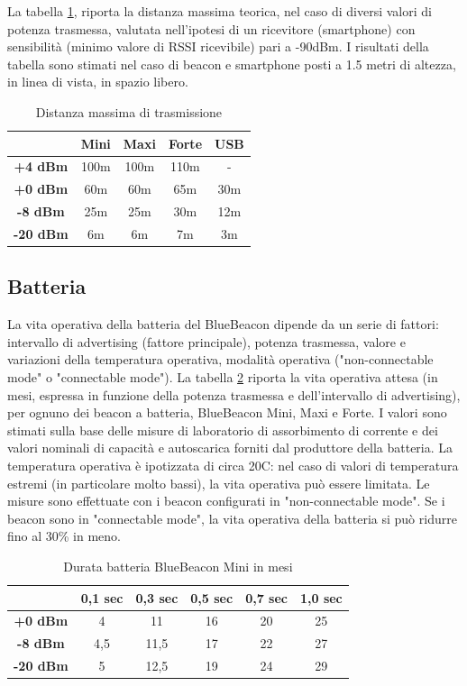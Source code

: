 La tabella \ref{tab:distanza}, riporta la distanza massima teorica, nel caso di diversi valori di potenza trasmessa, valutata nell'ipotesi di un ricevitore (smartphone) con sensibilità (minimo valore di RSSI ricevibile) pari a -90dBm. 
I risultati della tabella sono stimati nel caso di beacon e smartphone posti a 1.5 metri di altezza, in linea di vista, in spazio libero.
\begin{table}[htbp]
\begin{center}
\begin{tabular}{|c|c|c|c|c|}
\hline
 & Mini & Maxi & Forte & USB\\
\hline
\textbf{+4 dBm} & 100m & 100m & 110m & -\\
\hline
\textbf{+0 dBm} & 60m & 60m & 65m & 30m\\
\hline
\textbf{-8 dBm} & 25m & 25m & 30m & 12m\\
\hline
\textbf{-20 dBm} & 6m & 6m & 7m & 3m\\
\hline
\end{tabular}
\end{center}
\caption{Distanza massima di trasmissione}
\label{tab:distanza}
\end{table}
\subsection{Batteria}
La vita operativa della batteria del BlueBeacon dipende da un serie di fattori: 
intervallo di advertising (fattore principale), potenza trasmessa, valore e variazioni della temperatura operativa, modalità operativa ("non-connectable mode" o "connectable mode"). 
La tabella \ref{tab:batteria} riporta la vita operativa attesa (in mesi, espressa in funzione della potenza trasmessa e dell'intervallo di advertising), per ognuno dei beacon a batteria, BlueBeacon Mini, Maxi e Forte. 
I valori sono stimati sulla base delle misure di laboratorio di assorbimento di corrente e dei valori nominali di capacità e autoscarica forniti dal produttore della batteria. 
La temperatura operativa è ipotizzata di circa 20C: nel caso di valori di temperatura estremi (in particolare molto bassi), la vita operativa può essere limitata. 
Le misure sono effettuate con i beacon configurati in "non-connectable mode". Se i beacon sono in "connectable mode", la vita operativa della batteria si può ridurre fino al 30\% in meno.
\begin{table}[htbp]
\begin{center}
\begin{tabular}{|c|c|c|c|c|c|}
\hline
 & 0,1 sec & 0,3 sec & 0,5 sec & 0,7 sec & 1,0 sec\\
\hline
\textbf{+0 dBm} & 4 & 11 & 16 & 20 & 25\\
\hline
\textbf{-8 dBm} & 4,5 & 11,5 & 17 & 22 & 27\\
\hline
\textbf{-20 dBm} & 5 & 12,5 & 19 & 24 & 29\\
\hline
\end{tabular}
\end{center}
\caption{Durata batteria BlueBeacon Mini in mesi}
\label{tab:batteria}
\end{table}

